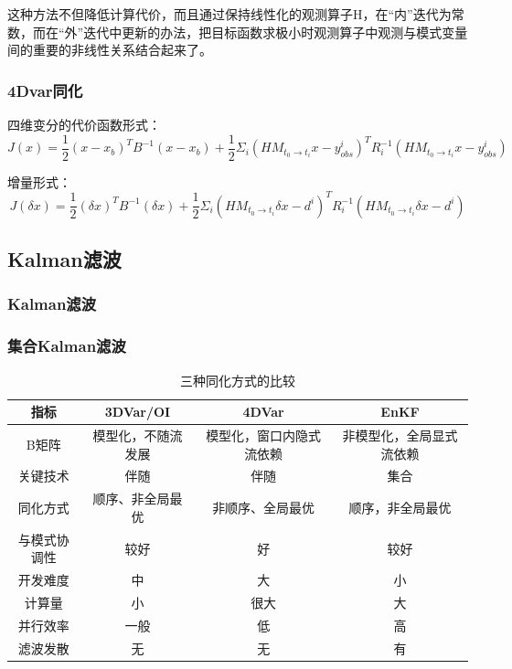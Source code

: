 \documentclass{article}
\begin{document}
这种方法不但降低计算代价，而且通过保持线性化的观测算子H，在“内”迭代为常数，而在“外”迭代中更新的办法，把目标函数求极小时观测算子中观测与模式变量间的重要的非线性关系结合起来了。

\subsubsection{4Dvar同化}
四维变分的代价函数形式：
$$J(x) = \frac{1}{2}(x-x_b)^{T}B^{-1}(x-x_b) + \frac{1}{2}\Sigma_i(HM_{t_0\longrightarrow t_i}x-y^i_{obs})^{T}R_i^{-1}(HM_{t_0\longrightarrow t_i}x-y^i_{obs})$$

增量形式：
$$J(\delta x) = \frac{1}{2}(\delta x)^{T}B^{-1}(\delta x) + \frac{1}{2}\Sigma_i(HM_{t_0\longrightarrow t_i}\delta x-d^i)^{T}R_i^{-1}(HM_{t_0\longrightarrow t_i}\delta x-d^i)$$

\subsection{Kalman滤波}
\subsubsection{Kalman滤波}
\subsubsection{集合Kalman滤波}
\begin{table}[h!]
  \begin{center}
    \caption{三种同化方式的比较}
    \begin{tabular}{c|c|c|c} 
      \textbf{指标} & \textbf{3DVar/OI} & \textbf{4DVar} & \textbf{EnKF}\\
      \hline
      B矩阵 & 模型化，不随流发展 & 模型化，窗口内隐式流依赖 & 非模型化，全局显式流依赖 \\
      关键技术 & 伴随 & 伴随 & 集合\\
      同化方式 & 顺序、非全局最优 & 非顺序、全局最优 & 顺序，非全局最优\\
      与模式协调性 & 较好 & 好 &  较好\\
      开发难度&中&大&小\\
      计算量&小&很大&大\\
      并行效率&一般&低&高\\
      滤波发散&无&无&有
    \end{tabular}
  \end{center}
  \end{table}
\end{document}
